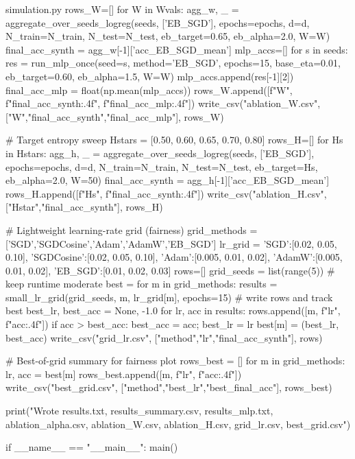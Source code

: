 \begin{filecontents*}{simulation.py}
    rows_W=[]
    for W in Wvals:
        agg_w, _ = aggregate_over_seeds_logreg(seeds, ['EB_SGD'], epochs=epochs, d=d, N_train=N_train, N_test=N_test,
                                               eb_target=0.65, eb_alpha=2.0, W=W)
        final_acc_synth = agg_w[-1]['acc_EB_SGD_mean']
        mlp_accs=[]
        for s in seeds:
            res = run_mlp_once(seed=s, method='EB_SGD', epochs=15, base_eta=0.01, eb_target=0.60, eb_alpha=1.5, W=W)
            mlp_accs.append(res[-1][2])
        final_acc_mlp = float(np.mean(mlp_accs))
        rows_W.append([f"{W}", f"{final_acc_synth:.4f}", f"{final_acc_mlp:.4f}"])
    write_csv("ablation_W.csv", ["W","final_acc_synth","final_acc_mlp"], rows_W)

    # Target entropy sweep
    Hstars = [0.50, 0.60, 0.65, 0.70, 0.80]
    rows_H=[]
    for Hs in Hstars:
        agg_h, _ = aggregate_over_seeds_logreg(seeds, ['EB_SGD'], epochs=epochs, d=d, N_train=N_train, N_test=N_test,
                                               eb_target=Hs, eb_alpha=2.0, W=50)
        final_acc_synth = agg_h[-1]['acc_EB_SGD_mean']
        rows_H.append([f"{Hs}", f"{final_acc_synth:.4f}"])
    write_csv("ablation_H.csv", ["Hstar","final_acc_synth"], rows_H)

    # Lightweight learning-rate grid (fairness)
    grid_methods = ['SGD','SGDCosine','Adam','AdamW','EB_SGD']
    lr_grid = {
        'SGD':[0.02, 0.05, 0.10],
        'SGDCosine':[0.02, 0.05, 0.10],
        'Adam':[0.005, 0.01, 0.02],
        'AdamW':[0.005, 0.01, 0.02],
        'EB_SGD':[0.01, 0.02, 0.03]
    }
    rows=[]
    grid_seeds = list(range(5))  # keep runtime moderate
    best = {}
    for m in grid_methods:
        results = small_lr_grid(grid_seeds, m, lr_grid[m], epochs=15)
        # write rows and track best
        best_lr, best_acc = None, -1.0
        for lr, acc in results:
            rows.append([m, f"{lr}", f"{acc:.4f}"])
            if acc > best_acc:
                best_acc = acc; best_lr = lr
        best[m] = (best_lr, best_acc)
    write_csv("grid_lr.csv", ["method","lr","final_acc_synth"], rows)

    # Best-of-grid summary for fairness plot
    rows_best = []
    for m in grid_methods:
        lr, acc = best[m]
        rows_best.append([m, f"{lr}", f"{acc:.4f}"])
    write_csv("best_grid.csv", ["method","best_lr","best_final_acc"], rows_best)

    print("Wrote results.txt, results_summary.csv, results_mlp.txt, ablation_alpha.csv, ablation_W.csv, ablation_H.csv, grid_lr.csv, best_grid.csv")

if __name__ == "__main__":
    main()
\end{filecontents*}

